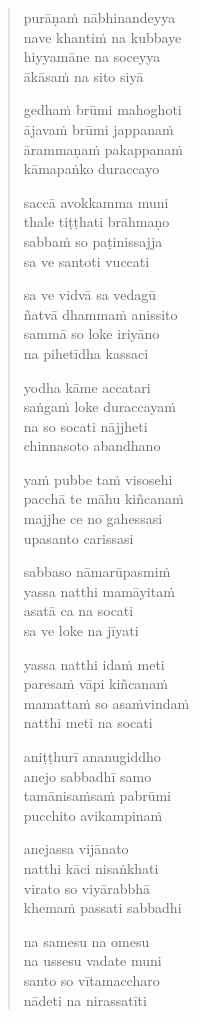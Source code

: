 \begin{verse}
purāṇaṁ nābhinandeyya\\
nave khantiṁ na kubbaye\\
hiyyamāne na soceyya\\
ākāsaṁ na sito siyā

gedhaṁ brūmi mahoghoti\\
ājavaṁ brūmi jappanaṁ\\
ārammaṇaṁ pakappanaṁ\\
kāmapaṅko duraccayo

saccā avokkamma muni\\
thale tiṭṭhati brāhmaṇo\\
sabbaṁ so paṭinissajja\\
sa ve santoti vuccati

sa ve vidvā sa vedagū\\
ñatvā dhammaṁ anissito\\
sammā so loke iriyāno\\
na pihetīdha kassaci

yodha kāme accatari\\
saṅgaṁ loke duraccayaṁ\\
na so socati nājjheti\\
chinnasoto abandhano

yaṁ pubbe taṁ visosehi\\
pacchā te māhu kiñcanaṁ\\
majjhe ce no gahessasi\\
upasanto carissasi

sabbaso nāmarūpasmiṁ\\
yassa natthi mamāyitaṁ\\
asatā ca na socati\\
sa ve loke na jīyati

yassa natthi idaṁ meti\\
paresaṁ vāpi kiñcanaṁ\\
mamattaṁ so asaṁvindaṁ\\
natthi meti na socati

aniṭṭhurī ananugiddho\\
anejo sabbadhī samo\\
tamānisaṁsaṁ pabrūmi\\
pucchito avikampinaṁ

anejassa vijānato\\
natthi kāci nisaṅkhati\\
virato so viyārabbhā\\
khemaṁ passati sabbadhi

na samesu na omesu\\
na ussesu vadate muni\\
santo so vītamaccharo\\
nādeti na nirassatīti

\end{verse}

